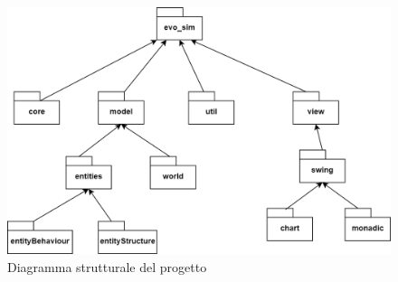 \begin{figure}[h!]
\centering
\includegraphics[width=\textwidth, scale=0.44]{img/Packages.png}
\caption{Diagramma strutturale del progetto}
\label{fig:pakage}
\end{figure}